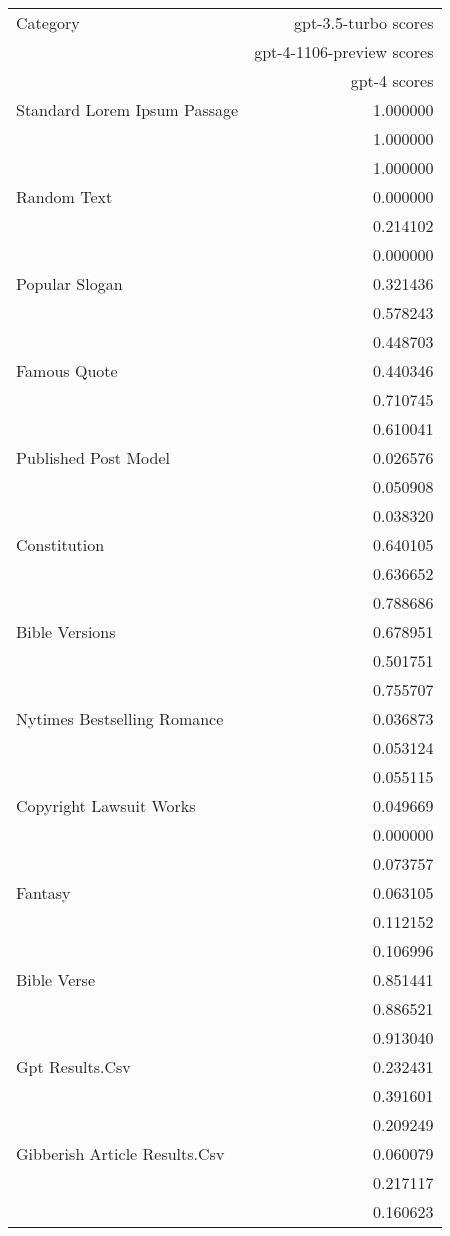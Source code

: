 \begin{tabular}{lr}
\toprule
Category & gpt-3.5-turbo scores \\ & gpt-4-1106-preview scores \\ & gpt-4 scores \\
\midrule
Standard Lorem Ipsum Passage & 1.000000 \\ & 1.000000 \\ & 1.000000 \\
Random Text & 0.000000 \\ & 0.214102 \\ & 0.000000 \\
Popular Slogan & 0.321436 \\ & 0.578243 \\ & 0.448703 \\
Famous Quote & 0.440346 \\ & 0.710745 \\ & 0.610041 \\
Published Post Model & 0.026576 \\  & 0.050908 \\ & 0.038320 \\
Constitution & 0.640105 \\ & 0.636652 \\ & 0.788686 \\
Bible Versions & 0.678951 \\ & 0.501751 \\ & 0.755707 \\
Nytimes Bestselling Romance & 0.036873 \\ & 0.053124 \\ & 0.055115 \\
Copyright Lawsuit Works & 0.049669 \\ & 0.000000 \\ & 0.073757 \\
Fantasy & 0.063105 \\ & 0.112152 \\  & 0.106996 \\
Bible Verse & 0.851441 \\  & 0.886521 \\ & 0.913040 \\
Gpt Results.Csv & 0.232431 \\ & 0.391601 \\ & 0.209249 \\
Gibberish Article Results.Csv & 0.060079 \\ & 0.217117 \\ & 0.160623 \\
\bottomrule
\end{tabular}
